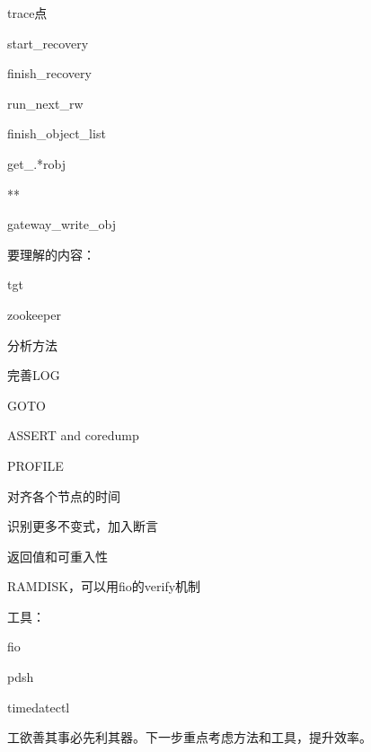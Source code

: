 trace点
\begin{enumbox}
\item start\_recovery
\item finish\_recovery
\item run\_next\_rw
\item finish\_object\_list
\item get\_.*robj
\item ***
\item gateway\_write\_obj
\end{enumbox}

要理解的内容：
\begin{enumbox}
\item tgt
\item zookeeper
\end{enumbox}

分析方法
\begin{enumbox}
\item 完善LOG
\item GOTO
\item ASSERT and coredump
\item PROFILE
\item 对齐各个节点的时间
\item 识别更多不变式，加入断言
\item 返回值和可重入性
\item RAMDISK，可以用fio的verify机制
\end{enumbox}

工具：
\begin{enumbox}
\item fio
\item pdsh
\item timedatectl
\end{enumbox}

工欲善其事必先利其器。下一步重点考虑方法和工具，提升效率。
